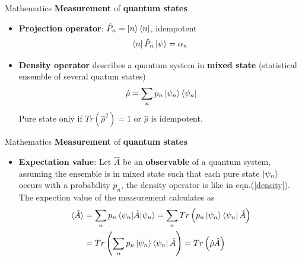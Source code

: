 \documentclass{beamer}
\begin{document}
\begin{frame}{Mathematics}
\textbf{Measurement} of \textbf{quantum states}
	\begin{itemize}
    	\item \textbf{Projection operator}: $\hat{P}_n = \ket{n}\bra{n}$, idempotent
        	\begin{equation}
            	\bra{n}\hat{P}_n\ket{\psi} = \alpha_n\
            \end{equation}
    	\item \textbf{Density operator} describes a quantum system in \textbf{mixed state} (statistical ensemble of several quatum states)
        	\begin{equation}\label{density}
            	\hat{\rho} = \sum_n p_n \ket{\psi_n}\bra{\psi_n}
            \end{equation}
         	Pure state only if $Tr(\hat{\rho}^2) = 1$ or $\hat{\rho}$ is idempotent.       
    \end{itemize}
\end{frame}

\begin{frame}{Mathematics}
\textbf{Measurement} of \textbf{quantum states}
	\begin{itemize}
    	\item \textbf{Expectation value}: Let $\hat{A}$ be an \textbf{observable} of a quantum system, assuming the ensemble is in mixed state such that each pure state $\ket{\psi_n}$ occurs with a probability $p_n$, the density operator is like in eqn.(\ref{density}). The expection value of the measurement calculates as
        \begin{equation}\begin{split}
\langle\hat{A}\rangle & =  \sum_n p_n\braket{\psi_n|\hat{A}|\psi_n}=\sum_n Tr\left(p_n\ket{\psi_n}\bra{\psi_n}\hat{A}\right)\\
	& = Tr\left(\sum_n p_n\ket{\psi_n}\bra{\psi_n}\hat{A}\right) = Tr\left(\hat{\rho}\hat{A}\right)
        \end{split}\end{equation}
    \end{itemize}
\end{frame}
\end{document}
